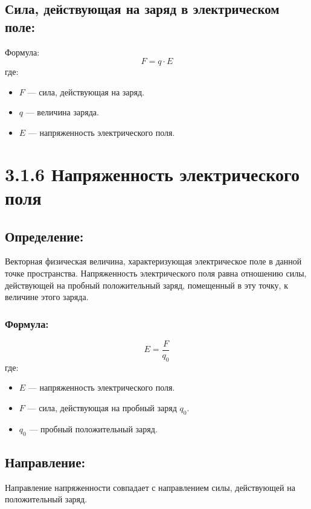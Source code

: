 \documentclass[a4paper,12pt]{article}
\begin{document}
\subsection*{Сила, действующая на заряд в электрическом поле:}
\vspace{-3pt}
Формула:
\vspace{-0.05em}
$$ F = q \cdot E $$
где:
\begin{itemize}
    \item $F$ — сила, действующая на заряд.
    \item $q$ — величина заряда.
   \item $E$ — напряженность электрического поля.
\end{itemize}


\newpage
\section*{3.1.6 Напряженность электрического поля}

\vspace{-9pt}
\subsection*{Определение:}
\vspace{-3pt}
Векторная физическая величина, характеризующая электрическое поле в данной точке пространства. Напряженность электрического поля равна отношению силы, действующей на пробный положительный заряд, помещенный в эту точку, к величине этого заряда.

\vspace{-9pt}
\subsubsection*{Формула:}
\vspace{-0.05em}
$$ E = \frac{F}{q_0} $$
где:
\begin{itemize}
    \item $E$ — напряженность электрического поля.
    \item $F$ — сила, действующая на пробный заряд $q_0$.
    \item $q_0$ — пробный положительный заряд.
\end{itemize}

\vspace{-9pt}
\subsection*{Направление:}
\vspace{-3pt}
Направление напряженности совпадает с направлением силы, действующей на положительный заряд.
\end{document}

